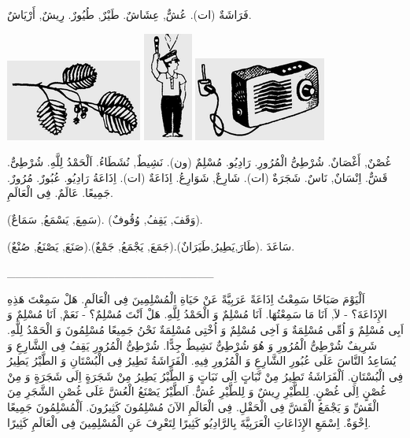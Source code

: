 \documentclass[a5paper]{article}
\begin{document}
فَرَاشَةٌ (ات). عُشٌّ, عِشَاشٌ. طَيْرٌ, طُيُورٌ. رِيشٌ, أَرْيَاشٌ. 

 \includegraphics[width=1.7602in,height=1.052in]{images/MuhammadBagauddinprettified-img070.png}   \includegraphics[width=0.6354in,height=1.4063in]{images/MuhammadBagauddinprettified-img071.png}   \includegraphics[width=1.7083in,height=1.0835in]{images/MuhammadBagauddinprettified-img072.png} 

غُصْنٌ, أَغْصَانٌ. شُرْطِىُّ الْمُرُورِ. رَادِيُو. مُسْلِمٌ (ون). نَشِيطٌ, نُشَطَاءُ. اَلْحَمْدُ لِلَّهِ. شُرْطِىٌّ. قَشٌّ. اِنْسَانٌ, نَاسٌ. شَجَرَةٌ (ات). شَارِعٌ, شَوَارِعُ. اِذَاعَةٌ (ات). اِذَاعَةُ رَادِيُو. عُبُورٌ. مُرُورٌ. جَمِيعًا. عَالَمٌ. فِى الْعَالَمِ.

(سَمِعَ, يَسْمَعُ, سَمَاعٌ). (وَقَفَ, يَقِفُ, وُقُوفٌ).

(صَنَعَ, يَصْنَعُ, صُنْعٌ).(جَمَعَ, يَجْمَعُ, جَمْعٌ).(طَارَ,يَطِيرُ,طَيَرَانٌ). سَاعَدَ.

\_\_\_\_\_\_\_\_\_\_\_\_\_\_\_\_\_\_\_\_\_\_\_\_\_

اَلْيَوْمَ صَبَاحًا سَمِعْتُ اِذَاعَةً عَرَبِيَّةً عَنْ حَيَاةِ الْمُسْلِمِينَ فِى الْعَالَمِ. هَلْ سَمِعْتَ هَذِهِ الإِذَاعَةَ؟ - لاَ, اَنَا مَا سَمِعْتُهَا. اَنَا مُسْلِمٌ وَ الْحَمْدُ لِلَّهِ. هَلْ اَنْتَ مُسْلِمٌ؟ - نَعَمْ, اَنَا مُسْلِمٌ وَ اَبِى مُسْلِمٌ وَ اُمِّى مُسْلِمَةٌ وَ اَخِى مُسْلِمٌ وَ اُخْتِى مُسْلِمَةٌ نَحْنُ جَمِيعًا مُسْلِمُونَ وَ الْحَمْدُ لِلَّهِ. شَرِيفٌ شُرْطِىُّ الْمُرُورِ وَ هُوَ شُرْطِىٌّ نَشِيطٌ جِدًّا. شُرْطِىُّ الْمُرُورِ يَقِفُ فِى الشَّارِعِ وَ يُسَاعِدُ النَّاسَ عَلَى عُبُورِ الشَّارِعِ وَ الْمُرُورِ فِيهِ. الْفَرَاشَةُ تَطِيرُ فِى الْبُسْتَانِ وَ الطَّيْرُ يَطِيرُ فِى الْبُسْتَانِ. اَلْفَرَاشَةُ تَطِيرُ مِنْ نَّبَاتٍ اِلَى نَبَاتٍ وَ الطَّيْرُ يَطِيرُ مِنْ شَجَرَةٍ اِلَى شَجَرَةٍ وَ مِنْ غُصْنٍ اِلَى غُصْنٍ. لِلطَّيْرِ رِيشٌ وَ لِلطَّيْرِ عُشٌّ. اَلطَّيْرُ يَصْنَعُ الْعُشَّ عَلَى غُصْنِ الشَّجَرِ مِنَ الْقَشِّ وَ يَجْمَعُ الْقَشَّ فِى الْحَقْلِ. فِى الْعَالَمِ الآنَ مُسْلِمُونَ كَثِيرُونَ. اَلْمُسْلِمُونَ جَمِيعًا اِخْوَةٌ. اِسْمَعِ الإِذَاعَاتِ الْعَرَبِيَّةَ بِالرَّادِيُو كَثِيرًا لِتَعْرِفَ عَنِ الْمُسْلِمِينَ فِى الْعَالَمِ كَثِيرًا.
\end{document}
